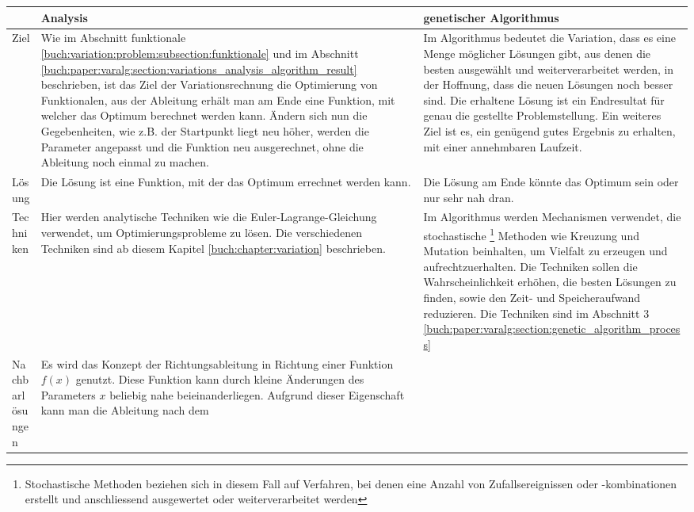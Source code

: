 \begin{xltabular}{\textwidth}{|L|X|X|}
   \hline
   & Analysis 
   & genetischer Algorithmus 
   \\ \hline
   Ziel
   & 
   Wie im Abschnitt funktionale \ref{buch:variation:problem:subsection:funktionale} und
   im Abschnitt \ref{buch:paper:varalg:section:variations_analysis_algorithm_result}
   beschrieben, ist das Ziel der Variationsrechnung die Optimierung von Funktionalen, aus der
   Ableitung erhält man am Ende eine Funktion, mit welcher das Optimum berechnet werden kann. 
   Ändern sich nun die Gegebenheiten, wie z.B. der Startpunkt liegt neu höher, werden die Parameter 
   angepasst und die Funktion neu ausgerechnet, ohne die Ableitung noch einmal zu machen.
   & 
   Im Algorithmus bedeutet die Variation, dass es eine Menge möglicher Lösungen gibt, 
   aus denen die besten ausgewählt und weiterverarbeitet werden, in der 
   Hoffnung, dass die neuen Lösungen noch besser sind. Die erhaltene Lösung ist ein Endresultat für
   genau die gestellte Problemstellung. Ein weiteres Ziel ist es,
   ein genügend gutes Ergebnis zu erhalten, mit einer annehmbaren Laufzeit.
   \\ \hline
   Lösung
   & 
   Die Lösung ist eine Funktion, mit der das Optimum errechnet werden kann.
   & 
   Die Lösung am Ende könnte das Optimum sein oder nur sehr nah dran.
   \\ \hline
   Techniken  
   & 
   Hier werden analytische Techniken wie die Euler-Lagrange-Gleichung verwendet, 
   um Optimierungsprobleme zu lösen. Die verschiedenen Techniken sind ab diesem Kapitel
   \ref{buch:chapter:variation} beschrieben.
   & Im Algorithmus werden Mechanismen verwendet, die stochastische
   \footnote{
      Stochastische Methoden beziehen sich in diesem Fall auf Verfahren, bei denen 
      eine Anzahl von Zufallsereignissen oder -kombinationen erstellt und anschliessend 
      ausgewertet oder weiterverarbeitet werden
   }
   Methoden wie Kreuzung und Mutation beinhalten, um Vielfalt zu erzeugen und aufrechtzuerhalten.
   Die Techniken sollen die Wahrscheinlichkeit erhöhen, die besten Lösungen zu finden, 
   sowie den Zeit- und Speicheraufwand reduzieren.
   Die Techniken sind im Abschnitt 3 \ref{buch:paper:varalg:section:genetic_algorithm_process}
   \\ \hline
   Nachbarlösungen
   & 
   Es wird das Konzept der Richtungsableitung in Richtung einer Funktion \(f(x)\)
   genutzt. Diese Funktion kann durch kleine Änderungen des Parameters \(x\) beliebig
   nahe beieinanderliegen. Aufgrund dieser Eigenschaft kann man die Ableitung nach dem

\end{xltabular}
